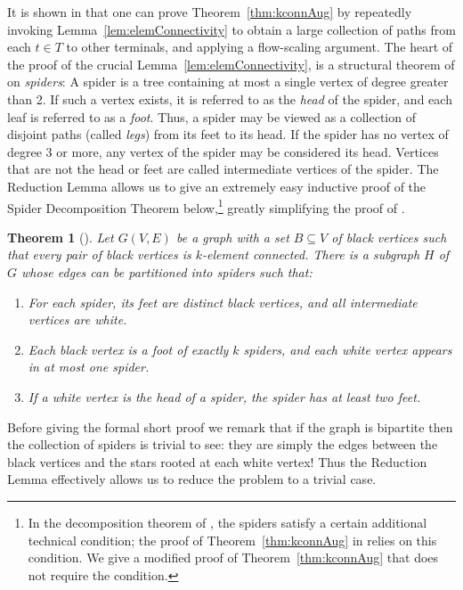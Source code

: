 \documentclass[11pt]{article}
\newtheorem{theorem}[lemma]{Theorem}
\begin{document}
It is shown in \cite{ChuzhoyK08} that one can prove
Theorem~\ref{thm:kconnAug} by repeatedly invoking
Lemma~\ref{lem:elemConnectivity} to obtain a large collection of paths
from each $t \in T$ to other terminals, and applying a flow-scaling
argument. The heart of the proof of the crucial
Lemma~\ref{lem:elemConnectivity}, is a structural theorem of
\cite{ChuzhoyK08} on \emph{spiders}: A spider is a tree containing at
most a single vertex of degree greater than 2. If such a vertex
exists, it is referred to as the \emph{head} of the spider, and each
leaf is referred to as a \emph{foot}.  Thus, a spider may be viewed as
a collection of disjoint paths (called \emph{legs}) from its feet to
its head. If the spider has no vertex of degree 3 or more, any vertex
of the spider may be considered its head.  Vertices that are not the
head or feet are called intermediate vertices of the spider. The
Reduction Lemma allows us to give an extremely easy inductive proof of
the Spider Decomposition Theorem below,\footnote{In the decomposition
  theorem of \cite{ChuzhoyK08}, the spiders satisfy a certain
  additional technical condition; the proof of
  Theorem~\ref{thm:kconnAug} in \cite{ChuzhoyK08} relies on this
  condition. We give a modified proof of Theorem~\ref{thm:kconnAug}
  that does not require the condition.}
greatly simplifying the proof of \cite{ChuzhoyK08}.

\begin{theorem}[\cite{ChuzhoyK08}]\label{thm:spiders}
  Let $G(V, E)$ be a graph with a set $B \subseteq V$ of black
  vertices such that every pair of black vertices is $k$-element
  connected. There is a subgraph $H$ of $G$ whose edges can be
  partitioned into spiders such that:
  \vspace{-0.1in}
  \begin{enumerate}
    \item For each spider, its feet are distinct black vertices, and
      all intermediate vertices are white.

    \item Each black vertex is a foot of exactly $k$ spiders, and each
      white vertex appears in at most one spider. 

    \item If a white vertex is the head of a spider, the spider has at
      least two feet.
  \end{enumerate}
\end{theorem}

Before giving the formal short proof we remark that if the graph is
bipartite then the collection of spiders is trivial to see: they are
simply the edges between the black vertices and the stars rooted at
each white vertex! Thus the Reduction Lemma effectively
allows us to reduce the problem to a trivial case. ~\\
\end{document}
